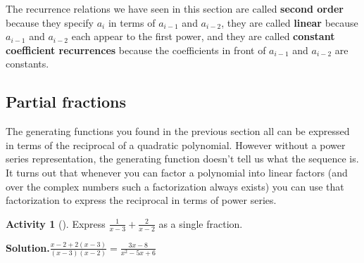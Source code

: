 \documentclass[10pt,]{book}
\newcommand{\terminology}[1]{\textbf{#1}}
\theoremstyle{plain}
\theoremstyle{definition}
\newtheorem{activity}[project]{Activity}
\numberwithin{equation}{chapter}
\begin{document}
The recurrence relations we have seen in this section are called \terminology{second order} because they specify \(a_i\) in terms of \(a_{i-1}\) and \(a_{i-2}\), they are called \terminology{linear} because \(a_{i-1}\) and \(a_{i-2}\) each appear to the first power, and they are called \terminology{constant coefficient recurrences} because the coefficients in front of \(a_{i-1}\) and \(a_{i-2}\) are constants.%
\typeout{************************************************}
\typeout{************************************************}
\subsection[{Partial fractions}]{Partial fractions}\label{subsection-49}
The generating functions you found in the previous section all can be expressed in terms of the reciprocal of a quadratic polynomial. However without a power series representation, the generating function doesn't tell us what the sequence is. It turns out that whenever you can factor a polynomial into linear factors (and over the complex numbers such a factorization always exists) you can use that factorization to express the reciprocal in terms of power series.%
\begin{activity}[]\label{simplifysumoffractions}
Express \(\frac{1}{x-3 } + \frac{2}{x-2}\) as a single fraction.%
\par\medskip\noindent%
\textbf{Solution.}\quad \(\frac{x-2 +2(x-3)}{(x-3)(x-2)}=\frac{3x-8}{x^2-5x+6}\)%
\end{activity}
\end{document}
